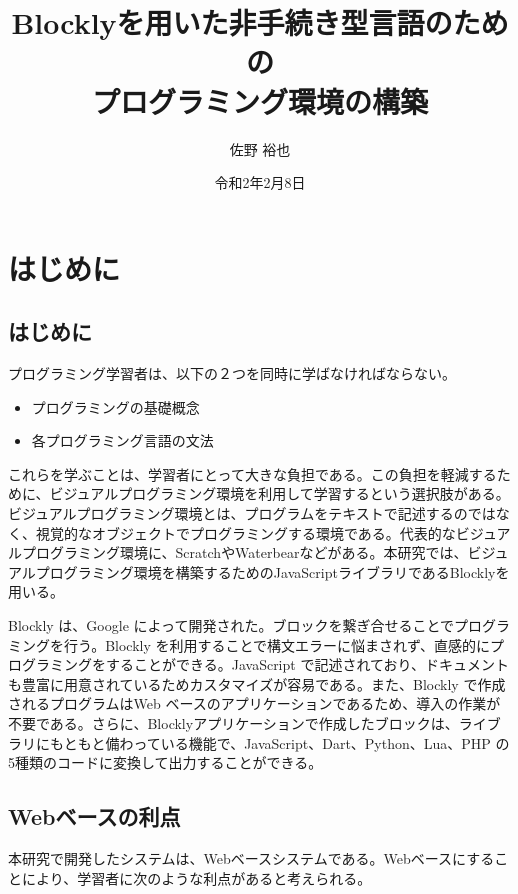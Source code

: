\documentclass{risepaper}
\title{Blocklyを用いた非手続き型言語のための \\ プログラミング環境の構築}
\author{佐野 裕也}
\date{令和2年2月8日}
\begin{document}
 
\maketitle
                                                          
   \chapter{はじめに}
   
   \section{はじめに}


  プログラミング学習者は、以下の２つを同時に学ばなければならない。
  
\begin{itemize}
\item プログラミングの基礎概念
\item 各プログラミング言語の文法
\end{itemize} 

これらを学ぶことは、学習者にとって大きな負担である。この負担を軽減するために、ビジュアルプログラミング環境を利用して学習するという選択肢がある。ビジュアルプログラミング環境とは、プログラムをテキストで記述するのではなく、視覚的なオブジェクトでプログラミングする環境である。代表的なビジュアルプログラミング環境に、Scratch\cite{Scratch}やWaterbear\cite{waterbear}などがある。本研究では、ビジュアルプログラミング環境を構築するためのJavaScriptライブラリであるBlockly\cite{Blockly}を用いる。
  
Blockly は、Google によって開発された。ブロックを繋ぎ合せることでプログラミングを行う。Blockly を利用することで構文エラーに悩まされず、直感的にプログラミングをすることができる。JavaScript で記述されており、ドキュメントも豊富に用意されているためカスタマイズが容易である。また、Blockly で作成されるプログラムはWeb ベースのアプリケーションであるため、導入の作業が不要である。さらに、Blocklyアプリケーションで作成したブロックは、ライブラリにもともと備わっている機能で、JavaScript、Dart、Python、Lua、PHP の5種類のコードに変換して出力することができる。

   \section{Webベースの利点}
   
本研究で開発したシステムは、Webベースシステムである。Webベースにすることにより、学習者に次のような利点があると考えられる。
\end{document}
